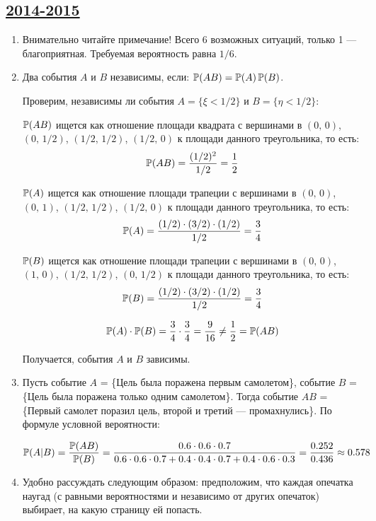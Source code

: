 \subsection[2014-2015]{\hyperref[sec:kr_01_2014_2015]{2014-2015}}
\label{sec:sol_kr_01_2014_2015}



\begin{enumerate}
\item Внимательно читайте примечание! Всего 6 возможных ситуаций, только 1 — благоприятная.
Требуемая вероятность равна $1/6$.

\item
Два события $A$ и $B$ независимы, если: $\P(AB) = \P(A) \P(B)$.

Проверим, независимы ли события $A = \{ \xi < 1/2 \} $ и  $B = \{ \eta < 1/2 \} $:

$\P(AB)$ ищется как отношение площади квадрата с вершинами в $(0,\,0)$, $(0,\,1/2)$,
$(1/2,\,1/2)$, $(1/2,\,0)$ к площади данного треугольника, то есть:
\[
\P(AB) = \frac{(1/2)^2}{1/2}= \frac{1}{2}
\]

$\P(A)$ ищется как отношение площади трапеции с вершинами в $(0,\,0)$, $(0,\,1)$,
$(1/2,\,1/2)$, $(1/2,\,0)$ к площади данного треугольника, то есть:
\[
\P(A) = \frac{(1/2)\cdot (3/2) \cdot (1/2)}{1/2}= \frac{3}{4}
\]

$\P(B)$ ищется как отношение площади трапеции с вершинами в $(0,\,0)$, $(1,\,0)$,
$(1/2,\,1/2)$, $(0,\,1/2)$ к площади данного треугольника, то есть:
\[
\P(B) = \frac{(1/2)\cdot (3/2) \cdot (1/2)}{1/2}= \frac{3}{4}
\]

\[
\P(A)\cdot \P(B) = \frac{3}{4} \cdot  \frac{3}{4} = \frac{9}{16} \ne \frac{1}{2} = \P(AB)
\]

Получается, события $A$ и $B$ зависимы.

\item
Пусть событие $A$ = \{Цель была поражена первым самолетом\},
событие $B$ = \{Цель была поражена только одним самолетом\}.
Тогда событие $AB$ = \{Первый самолет поразил цель, второй и третий — промахнулись\}.
По формуле условной вероятности:

\[\P(A|B) = \frac{\P(AB)}{\P(B)} = \frac{0.6 \cdot 0.6 \cdot 0.7}{0.6\cdot 0.6 \cdot 0.7 + 0.4 \cdot 0.4 \cdot 0.7 + 0.4 \cdot 0.6 \cdot 0.3} = \frac{0.252}{0.436} \approx 0.578\]

\item
Удобно рассуждать следующим образом: предположим, что каждая опечатка наугад
(с равными вероятностями и независимо от других опечаток) выбирает, на какую
страницу ей попасть.


\end{enumerate}
